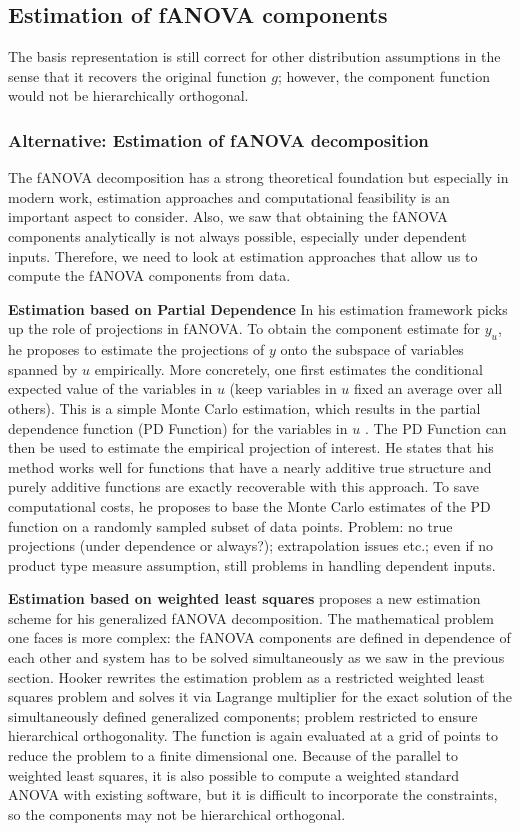 \subsection{Estimation of fANOVA components}
The basis representation is still correct for other distribution assumptions in the sense that it recovers the original function $g$; however, the component function would not be hierarchically orthogonal.
\subsubsection{Alternative: Estimation of fANOVA decomposition}
The fANOVA decomposition has a strong theoretical foundation but especially in modern work, estimation approaches and computational feasibility is an important aspect to consider.
Also, we saw that obtaining the fANOVA components analytically is not always possible, especially under dependent inputs. Therefore, we need to look at estimation approaches that allow us to compute the fANOVA components from data.\par

\textbf{Estimation based on Partial Dependence}
In his estimation framework \cite{hooker2004} picks up the role of projections in fANOVA. To obtain the component estimate for $y_u$, he proposes to estimate the projections of $y$ onto the subspace of variables spanned by $u$ empirically.
More concretely, one first estimates the conditional expected value of the variables in $u$ (keep variables in $u$ fixed an average over all others). This is a simple Monte Carlo estimation, which results in the partial dependence function (PD Function) for the variables in $u$ \citep{hooker2004}.
The PD Function can then be used to estimate the empirical projection of interest. He states that his method works well for functions that have a nearly additive true structure and purely additive functions are exactly recoverable with this approach. To save computational costs, he proposes to base the Monte Carlo estimates of the PD function on a randomly sampled subset of data points.
Problem: no true projections (under dependence or always?); extrapolation issues etc.; even if no product type measure assumption, still problems in handling dependent inputs.\par

\textbf{Estimation based on weighted least squares}
\cite{hooker2007} proposes a new estimation scheme for his generalized fANOVA decomposition. The mathematical problem one faces is more complex: the fANOVA components are defined in dependence of each other and system has to be solved simultaneously as we saw in the previous section.
Hooker rewrites the estimation problem as a restricted weighted least squares problem and solves it via Lagrange multiplier for the exact solution of the simultaneously defined generalized components; problem restricted to ensure hierarchical orthogonality.
The function is again evaluated at a grid of points to reduce the problem to a finite dimensional one. 
Because of the parallel to weighted least squares, it is also possible to compute a weighted standard ANOVA with existing software, but it is difficult to incorporate the constraints, so the components may not be hierarchical orthogonal.\par

